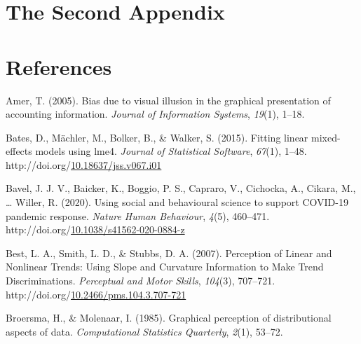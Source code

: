 \documentclass[print]{nuthesis}
\newlength{\cslhangindent}
\newenvironment{CSLReferences}%
{\setlength{\parindent}{0pt}%
\everypar{\setlength{\hangindent}{\cslhangindent}}\ignorespaces}%
{\par}
\begin{document}
\hypertarget{the-second-appendix}{%
\chapter{The Second Appendix}\label{the-second-appendix}}

\backmatter

\hypertarget{references}{%
\chapter*{References}\label{references}}

\noindent

\setlength{\parindent}{-0.20in}
\setlength{\leftskip}{0.20in}
\setlength{\parskip}{8pt}

\hypertarget{refs}{}
\begin{CSLReferences}{1}{0}
\leavevmode\hypertarget{ref-amer2005bias}{}%
Amer, T. (2005). Bias due to visual illusion in the graphical presentation of accounting information. \emph{Journal of Information Systems}, \emph{19}(1), 1--18.

\leavevmode\hypertarget{ref-lme4}{}%
Bates, D., Mächler, M., Bolker, B., \& Walker, S. (2015). Fitting linear mixed-effects models using {lme4}. \emph{Journal of Statistical Software}, \emph{67}(1), 1--48. http://doi.org/\href{https://doi.org/10.18637/jss.v067.i01}{10.18637/jss.v067.i01}

\leavevmode\hypertarget{ref-bavel_using_2020}{}%
Bavel, J. J. V., Baicker, K., Boggio, P. S., Capraro, V., Cichocka, A., Cikara, M., \ldots{} Willer, R. (2020). Using social and behavioural science to support {COVID}-19 pandemic response. \emph{Nature Human Behaviour}, \emph{4}(5), 460--471. http://doi.org/\href{https://doi.org/10.1038/s41562-020-0884-z}{10.1038/s41562-020-0884-z}

\leavevmode\hypertarget{ref-best_perception_2007}{}%
Best, L. A., Smith, L. D., \& Stubbs, D. A. (2007). Perception of {Linear} and {Nonlinear} {Trends}: {Using} {Slope} and {Curvature} {Information} to {Make} {Trend} {Discriminations}. \emph{Perceptual and Motor Skills}, \emph{104}(3), 707--721. http://doi.org/\href{https://doi.org/10.2466/pms.104.3.707-721}{10.2466/pms.104.3.707-721}

\leavevmode\hypertarget{ref-broersma1985graphical}{}%
Broersma, H., \& Molenaar, I. (1985). Graphical perception of distributional aspects of data. \emph{Computational Statistics Quarterly}, \emph{2}(1), 53--72.


\end{CSLReferences}
\end{document}
